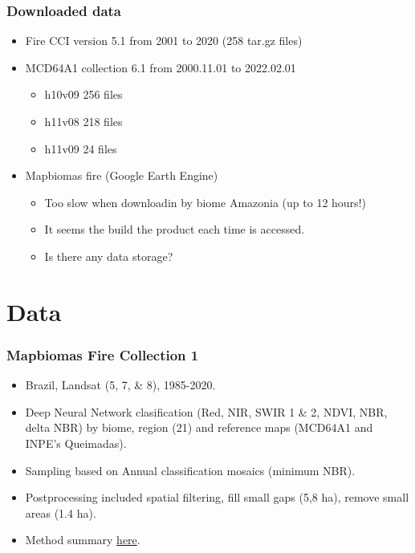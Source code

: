 \documentclass{beamer}
\begin{document}
\begin{frame}
    \frametitle{Downloaded data}
    \begin{itemize}
        \item Fire CCI version 5.1 from 2001 to 2020 (258 tar.gz files)
        \item MCD64A1 collection 6.1 from 2000.11.01 to 2022.02.01 
            \begin{itemize}
                \item h10v09 256 files
                \item h11v08 218 files 
                \item h11v09  24 files
            \end{itemize}
        \item Mapbiomas fire (Google Earth Engine)
            \begin{itemize}
                \item Too slow when downloadin by biome Amazonia (up to 12 
                    hours!)
                \item It seems the build the product each time is accessed.
                \item Is there any data storage? 
            \end{itemize}
    \end{itemize}
\end{frame}


\section{Data}

\begin{frame}
    \frametitle{Mapbiomas Fire Collection 1}
    \begin{itemize}
        \item Brazil, Landsat (5, 7, \& 8), 1985-2020.
        \item Deep Neural Network clasification (Red, NIR, SWIR 1 \& 2, NDVI, 
            NBR, delta NBR) by biome, region (21) and 
            reference maps (MCD64A1 and INPE's Queimadas).
        \item Sampling based on Annual classification mosaics (minimum NBR).
        \item Postprocessing included spatial filtering, fill small gaps (5,8 
            ha), remove small areas (1.4 ha).
        \item Method summary 
            \href{https://mapbiomas.org/en/mapbiomas-fire-method}{here}.
    \end{itemize}
\end{frame}
\end{document}
